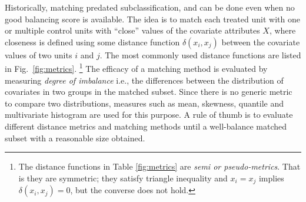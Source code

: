 
Historically, matching  predated
subclassification, and can be done even when no good balancing score
is available.
%
%
The idea is to match each treated unit with one or multiple control
units with ``close'' values of the covariate attributes $X$, where
closeness is defined using some distance function $\delta(x_i,x_j)$
between the covariate values of two units $i$ and $j$.  The most
commonly used distance functions are listed in
Fig.~\ref{fig:metrics}. \footnote{The distance functions in Table
  \ref{fig:metrics} are {\em semi or pseudo-metrics}. That is they are
  symmetric; they satisfy triangle inequality and $x_i=x_j$ implies
  $\delta(x_i,x_j)=0$, but the converse does not hold.} The efficacy
of a matching method is evaluated by measuring {\em degree of
  imbalance} i.e., the differences between the distribution of
covariates in two groups in the matched subset. Since there is no
generic metric to compare two distributions, measures such as mean,
skewness, quantile and multivariate histogram are used for this
purpose.  A rule of thumb is to
evaluate different distance metrics and matching methods until a
well-balance matched subset with a reasonable size obtained.



